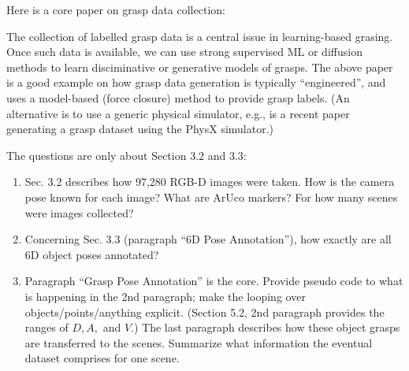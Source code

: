 

\renewcommand{\course}{Robot Learning}
\renewcommand{\coursedate}{Summer 2024}
\renewcommand{\exnum}{Weekly Exercise 9}

\renewcommand{\teacher}{Marc Toussaint \& Wolfgang H{\"o}nig}
\renewcommand{\addressTUB}{
  Learning~\&~Intelligent~Systems Lab, Intelligent Multi-Robot Coordination Lab, TU~Berlin\\\small
  Marchstr. 23, 10587 Berlin, Germany
}

\exercises




\exercisestitle



Here is a core paper on grasp data collection:


The collection of labelled grasp data is a central issue in
learning-based grasing. Once such data is available, we can use strong
supervised ML or diffusion methods to learn disciminative or
generative models of grasps. The above paper is a good example on how
grasp data generation is typically ``engineered'', and uses a
model-based (force closure) method to provide grasp labels. (An
alternative is to use a generic physical
simulator, e.g., \cite{2021-eppner-AcronymLargescaleGrasp} is a recent
paper generating a grasp dataset using the PhysX simulator.)

The questions are only about Section 3.2 and 3.3:
\begin{enumerate}
\item Sec. 3.2 describes how 97,280 RGB-D images were taken. How is
the camera pose known for each image? What are ArUco markers? For how
many scenes were images collected?


\item Concerning Sec. 3.3 (paragraph ``6D Pose Annotation''), how exactly are all 6D object poses
annotated?


\item Paragraph ``Grasp Pose Annotation'' is the core. Provide pseudo
code to what is happening in the 2nd paragraph; make the looping over
objects/points/anything explicit. (Section 5.2, 2nd
paragraph provides the ranges of $D, A,$ and $V$.) The last paragraph
describes how these object grasps are transferred to the
scenes. Summarize what information the eventual dataset comprises for
one scene.

\end{enumerate}

